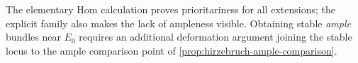 The elementary Hom calculation proves prioritariness for all extensions;
the explicit family also makes the lack of ampleness visible.
Obtaining stable \emph{ample} bundles near $E_0$ requires an additional
deformation argument joining the stable locus to the ample comparison
point of \cref{prop:hirzebruch-ample-comparison}.

